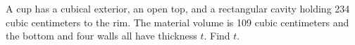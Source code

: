 A cup has a cubical exterior, an open top, and a rectangular cavity holding 234 cubic centimeters to the rim. The material volume is 109 cubic centimeters and the bottom and four walls all have thickness $t$. Find $t$.

